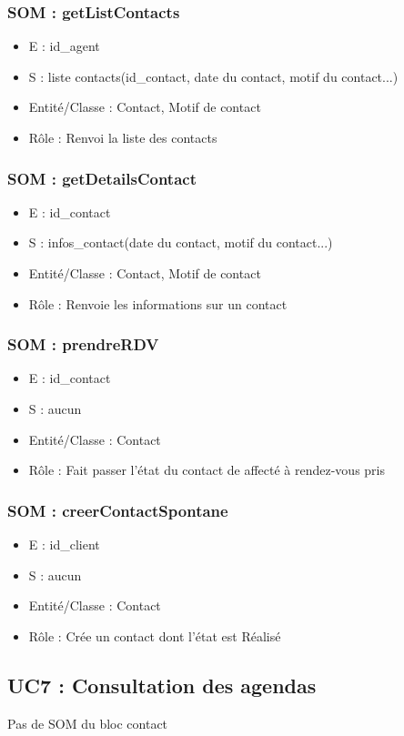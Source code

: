 \subsubsection{SOM : getListContacts}
\begin{itemize}
\item E : id\_agent
\item S : liste contacts(id\_contact, date du contact, motif du contact...)
\item Entité/Classe : Contact, Motif de contact
\item Rôle : Renvoi la liste des contacts
\end{itemize}
\subsubsection{SOM : getDetailsContact}
\begin{itemize}
\item E : id\_contact
\item S : infos\_contact(date du contact, motif du contact...)
\item Entité/Classe : Contact, Motif de contact
\item Rôle : Renvoie les informations sur un contact
\end{itemize}
\subsubsection{SOM : prendreRDV}
\begin{itemize}
\item E : id\_contact
\item S : aucun
\item Entité/Classe : Contact
\item Rôle : Fait passer l’état du contact de affecté à rendez-vous pris
\end{itemize}
\subsubsection{SOM : creerContactSpontane}
\begin{itemize}
\item E : id\_client
\item S : aucun
\item Entité/Classe : Contact
\item Rôle : Crée un contact dont l’état est Réalisé
\end{itemize}
\subsection{UC7 : Consultation des agendas}
Pas de SOM du bloc contact

